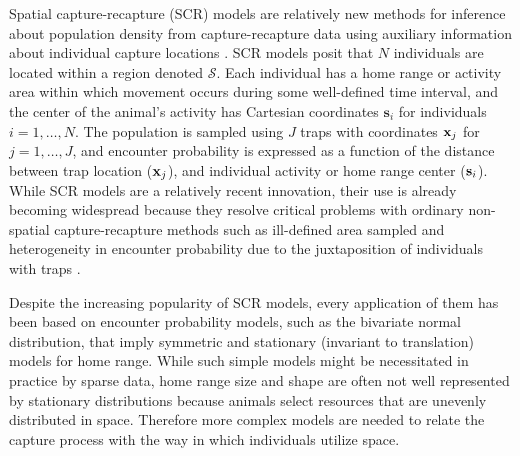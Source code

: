 \documentclass[12pt]{article}
\begin{document}
Spatial capture-recapture (SCR) models are relatively new methods for
inference about population density from capture-recapture data using
auxiliary information about individual capture locations
\citep{efford:2004,borchers_efford:2008, royle_young:2008}.  SCR
models posit that $N$ individuals are located within a region denoted
$\mathcal{S}$. Each individual has a home range or activity area
within which movement occurs during some well-defined time interval,
and the center of the animal's activity has Cartesian coordinates
$\mathbf{s}_i$ for individuals $i=1,\ldots,N$. The population is sampled using $J$
traps with coordinates ${\bf x}_{j}$ for $j=1,\ldots,J$, and encounter
probability is expressed as a function of the distance between trap
location (${\bf x}_{j}$), and individual activity or home range center (${\bf
  s}_{i}$).
While SCR models are a relatively recent innovation, their use is already becoming widespread
\citep{efford_etal:2009ecol, gardner_etal:2010jwm,
  gardner_etal:2010ecol,kery_etal:2011, gopalaswamy_etal:2012ecol,
  foster_harmsen:2012} because they resolve critical problems with
ordinary non-spatial capture-recapture methods such as ill-defined
area sampled and heterogeneity in encounter probability due to the
juxtaposition of individuals with traps
\citep{borchers:2011}.

Despite the increasing popularity of SCR models, every
application of them has been based on encounter probability
models, such as the bivariate normal distribution, that imply
symmetric and stationary (invariant to translation) models for home range.
While such simple models might be necessitated in practice by sparse
data,
home range size and shape are often not well represented by stationary
distributions because animals select
resources
that
are unevenly distributed in space. Therefore
more complex models are needed to relate the capture
process with the way in which individuals utilize
space.
\end{document}
